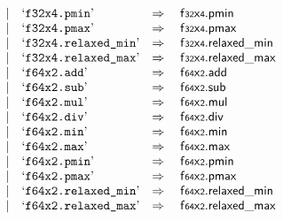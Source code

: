 $$\begin{array}[t]{@{}lrrl@{}l@{}l@{}l@{}}
& & | & \mbox{‘\texttt{f32x4.pmin}’} & \quad\Rightarrow\quad{} & {\mathsf{f{\scriptstyle 32}}}{\mathsf{x}}{\mathsf{{\scriptstyle 4}}} {.} \mathsf{pmin} \\
& & | & \mbox{‘\texttt{f32x4.pmax}’} & \quad\Rightarrow\quad{} & {\mathsf{f{\scriptstyle 32}}}{\mathsf{x}}{\mathsf{{\scriptstyle 4}}} {.} \mathsf{pmax} \\
& & | & \mbox{‘\texttt{f32x4.relaxed\_min}’} & \quad\Rightarrow\quad{} & {\mathsf{f{\scriptstyle 32}}}{\mathsf{x}}{\mathsf{{\scriptstyle 4}}} {.} \mathsf{relaxed\_min} \\
& & | & \mbox{‘\texttt{f32x4.relaxed\_max}’} & \quad\Rightarrow\quad{} & {\mathsf{f{\scriptstyle 32}}}{\mathsf{x}}{\mathsf{{\scriptstyle 4}}} {.} \mathsf{relaxed\_max} \\
& & | & \mbox{‘\texttt{f64x2.add}’} & \quad\Rightarrow\quad{} & {\mathsf{f{\scriptstyle 64}}}{\mathsf{x}}{\mathsf{{\scriptstyle 2}}} {.} \mathsf{add} \\
& & | & \mbox{‘\texttt{f64x2.sub}’} & \quad\Rightarrow\quad{} & {\mathsf{f{\scriptstyle 64}}}{\mathsf{x}}{\mathsf{{\scriptstyle 2}}} {.} \mathsf{sub} \\
& & | & \mbox{‘\texttt{f64x2.mul}’} & \quad\Rightarrow\quad{} & {\mathsf{f{\scriptstyle 64}}}{\mathsf{x}}{\mathsf{{\scriptstyle 2}}} {.} \mathsf{mul} \\
& & | & \mbox{‘\texttt{f64x2.div}’} & \quad\Rightarrow\quad{} & {\mathsf{f{\scriptstyle 64}}}{\mathsf{x}}{\mathsf{{\scriptstyle 2}}} {.} \mathsf{div} \\
& & | & \mbox{‘\texttt{f64x2.min}’} & \quad\Rightarrow\quad{} & {\mathsf{f{\scriptstyle 64}}}{\mathsf{x}}{\mathsf{{\scriptstyle 2}}} {.} \mathsf{min} \\
& & | & \mbox{‘\texttt{f64x2.max}’} & \quad\Rightarrow\quad{} & {\mathsf{f{\scriptstyle 64}}}{\mathsf{x}}{\mathsf{{\scriptstyle 2}}} {.} \mathsf{max} \\
& & | & \mbox{‘\texttt{f64x2.pmin}’} & \quad\Rightarrow\quad{} & {\mathsf{f{\scriptstyle 64}}}{\mathsf{x}}{\mathsf{{\scriptstyle 2}}} {.} \mathsf{pmin} \\
& & | & \mbox{‘\texttt{f64x2.pmax}’} & \quad\Rightarrow\quad{} & {\mathsf{f{\scriptstyle 64}}}{\mathsf{x}}{\mathsf{{\scriptstyle 2}}} {.} \mathsf{pmax} \\
& & | & \mbox{‘\texttt{f64x2.relaxed\_min}’} & \quad\Rightarrow\quad{} & {\mathsf{f{\scriptstyle 64}}}{\mathsf{x}}{\mathsf{{\scriptstyle 2}}} {.} \mathsf{relaxed\_min} \\
& & | & \mbox{‘\texttt{f64x2.relaxed\_max}’} & \quad\Rightarrow\quad{} & {\mathsf{f{\scriptstyle 64}}}{\mathsf{x}}{\mathsf{{\scriptstyle 2}}} {.} \mathsf{relaxed\_max} \\

\end{array}$$
